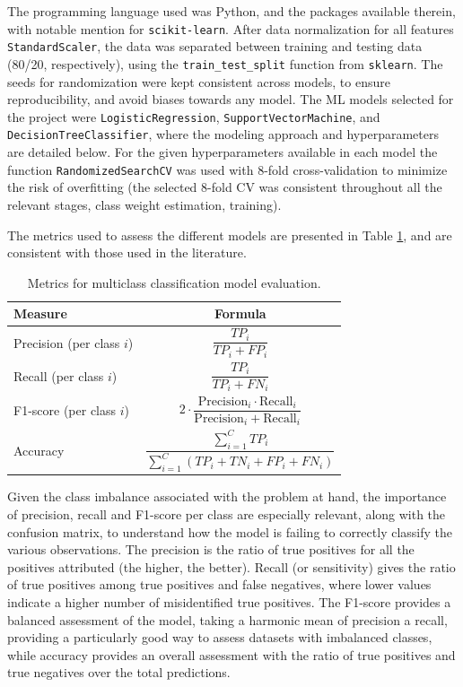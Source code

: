 \documentclass[conference]{IEEEtran}
\begin{document}
The programming language used was Python, and the packages available therein, with notable mention for \texttt{scikit-learn}. After data normalization for all features \texttt{StandardScaler}, the data was separated between training and testing data (80/20, respectively), using the \texttt{train\_test\_split} function from \texttt{sklearn}. The seeds for randomization were kept consistent across models, to ensure reproducibility, and avoid biases towards any model. 
The ML models selected for the project were \texttt{LogisticRegression}, \texttt{SupportVectorMachine}, and \texttt{DecisionTreeClassifier}, where the modeling approach and hyperparameters are detailed below. For the given hyperparameters available in each model the function \texttt{RandomizedSearchCV} was used with 8-fold cross-validation to minimize the risk of overfitting (the selected 8-fold CV was consistent throughout all the relevant stages, class weight estimation, training). 

The metrics used to assess the different models are presented in Table \ref{evaluationmetrics}, and are consistent with those used in the literature.

\begin{table}[H]
\centering
\caption{Metrics for multiclass classification model evaluation.}
\label{evaluationmetrics}
\begin{tabular}{lc}
\toprule
\textbf{Measure} & \textbf{Formula} \\
\midrule
Precision (per class $i$) & $\dfrac{TP_i}{TP_i + FP_i}$ \\[1em]
Recall (per class $i$) & $\dfrac{TP_i}{TP_i + FN_i}$ \\[1em]
F1-score (per class $i$) & $2 \cdot \dfrac{\text{Precision}_i \cdot \text{Recall}_i}{\text{Precision}_i + \text{Recall}_i}$ \\[1em] 
Accuracy & $\dfrac{\sum_{i=1}^{C} TP_i}{\sum_{i=1}^{C} (TP_i + TN_i + FP_i + FN_i)}$ \\[1em]
\bottomrule
\end{tabular}
\end{table}

Given the class imbalance associated with the problem at hand, the importance of precision, recall and F1-score per class are especially relevant, along with the confusion matrix, to understand how the model is failing to correctly classify the various observations. The precision is the ratio of true positives for all the positives attributed (the higher, the better). Recall (or sensitivity) gives the ratio of true positives among true positives and false negatives, where lower values indicate a higher number of misidentified true positives. The F1-score provides a balanced assessment of the model, taking a harmonic mean of precision a recall, providing a particularly good way to assess datasets with imbalanced classes, while accuracy provides an overall assessment with the ratio of true positives and true negatives over the total predictions.
\end{document}
